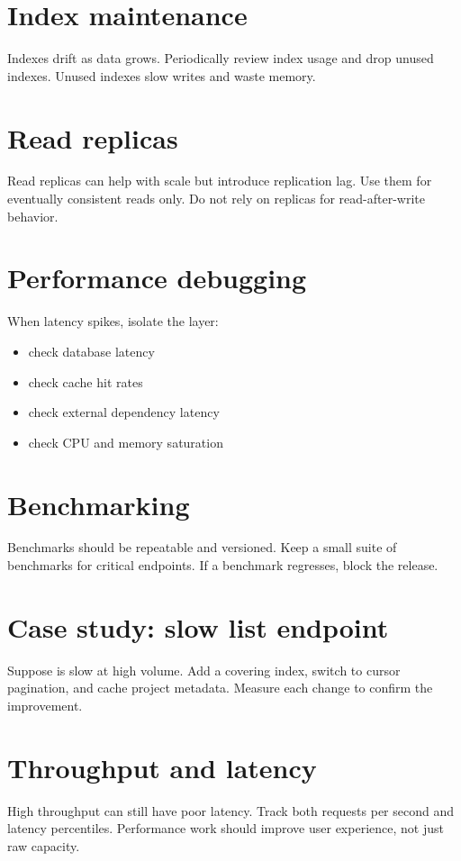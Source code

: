 \section{Index maintenance}
Indexes drift as data grows.
Periodically review index usage and drop unused indexes.
Unused indexes slow writes and waste memory.

\section{Read replicas}
Read replicas can help with scale but introduce replication lag.
Use them for eventually consistent reads only.
Do not rely on replicas for read-after-write behavior.

\section{Performance debugging}
When latency spikes, isolate the layer:
\begin{itemize}[nosep]
  \item check database latency
  \item check cache hit rates
  \item check external dependency latency
  \item check CPU and memory saturation
\end{itemize}

\section{Benchmarking}
Benchmarks should be repeatable and versioned.
Keep a small suite of benchmarks for critical endpoints.
If a benchmark regresses, block the release.

\section{Case study: slow list endpoint}
Suppose  is slow at high volume.
Add a covering index, switch to cursor pagination, and cache project metadata.
Measure each change to confirm the improvement.

\section{Throughput and latency}
High throughput can still have poor latency.
Track both requests per second and latency percentiles.
Performance work should improve user experience, not just raw capacity.

